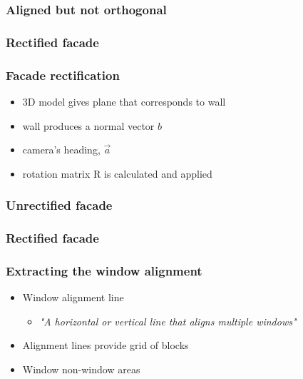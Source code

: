 \documentclass{beamer}
\begin{document}
\frame
{
	\frametitle{Aligned but not orthogonal}
}

\frame
{
	\frametitle{Rectified facade}
}

\frame
{
	\frametitle{Facade rectification}
	\begin{itemize}
		\item <+-| alert@+> 3D model gives plane that corresponds to wall
		\item <+-| alert@+> wall produces a normal vector $b$
		\item <+-| alert@+> camera's heading, $\vec{a}$
		\item <+-| alert@+> rotation matrix R is calculated and applied
	\end{itemize}
}


\frame
{
	\frametitle{Unrectified facade}
}

\frame
{
	\frametitle{Rectified facade}
}


\frame
{
}

\frame
{
}


\frame
{
	\frametitle{Extracting the window alignment}
	\begin{itemize}
	\item <+-| alert@+> Window alignment line
	\begin{itemize}
		\item <+-| alert@+> \emph{"A horizontal or vertical line that aligns multiple windows"}
	\end{itemize}
	\item <+-| alert@+> Alignment lines provide grid of blocks
	\item <+-| alert@+> Window non-window areas
	\end{itemize}
	
}
\end{document}
